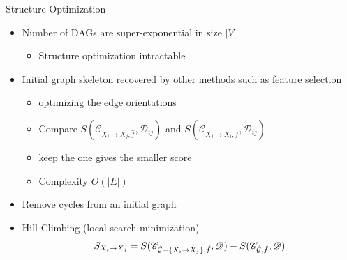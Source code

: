 \documentclass{beamer}
\begin{document}
\begin{frame}{Structure Optimization}
	\begin{itemize}
		\item Number of DAGs are super-exponential in size $|V|$~\parencite{Robinson1977}
		      \begin{itemize}
			      \item Structure optimization intractable
		      \end{itemize}
		\item Initial graph skeleton recovered by other methods such as feature selection~\parencite{Yamada2014}
		      \begin{itemize}
			      \item optimizing the edge orientations
			      \item Compare $S(\mathscr{C}_{X_i \rightarrow X_j,\hat{f}}, \mathscr{D}_{ij})$ and $S(\mathscr{C}_{X_j \rightarrow X_i,\hat{f}}, \mathscr{D}_{ij})$
			      \item keep the one gives the smaller score
			      \item Complexity $O(|E|)$
		      \end{itemize}
		\item Remove cycles from an initial graph
		\item Hill-Climbing (local search minimization)
		      \[
			      S_{X_i \rightarrow X_j} = S(\mathscr{C}_{\hat{\mathcal{G}} - \{X_i \rightarrow X_j\},\hat{f}}, \mathscr{D}) - S(\mathscr{C}_{\hat{\cal G},\hat{f}}, \mathscr{D})
		      \]
	\end{itemize}
\end{frame}
\end{document}
